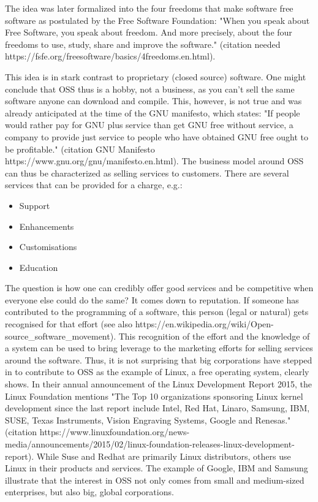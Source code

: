 \documentclass[a4paper]{report}
\begin{document}
The idea was later formalized into the four freedoms that make software free software as postulated by the Free Software Foundation: "When you speak about Free Software, you speak about freedom. And more precisely, about the four freedoms to use, study, share and improve the software." (citation needed https://fsfe.org/freesoftware/basics/4freedoms.en.html).

This idea is in stark contrast to proprietary (closed source) software. One might conclude that OSS thus is a hobby, not a business, as you can't sell the same software anyone can download and compile. This, however, is not true and was already anticipated at the time of the GNU manifesto, which states: "If people would rather pay for GNU plus service than get GNU free without service, a company to provide just service to people who have obtained GNU free ought to be profitable." (citation GNU Manifesto https://www.gnu.org/gnu/manifesto.en.html). The business model around OSS can thus be characterized as selling services to customers. There are several services that can be provided for a charge, e.g.:
\begin{itemize}
	\item Support
	\item Enhancements
	\item Customisations
	\item Education 
\end{itemize}

The question is how one can credibly offer good services and be competitive when everyone else could do the same? It comes down to reputation. If someone has contributed to the programming of a software, this person (legal or natural) gets recognised for that effort (see also https://en.wikipedia.org/wiki/Open-source\_software\_movement). This recognition of the effort and the knowledge of a system can be used to bring leverage to the marketing efforts for selling services around the software. Thus, it is not surprising that big corporations have stepped in to contribute to OSS as the example of Linux, a free operating system, clearly shows. In their annual announcement of the Linux Development Report 2015, the Linux Foundation mentions "The Top 10 organizations sponsoring Linux kernel development since the last report include Intel, Red Hat, Linaro, Samsung, IBM, SUSE, Texas Instruments, Vision Engraving Systems, Google and Renesas." (citation https://www.linuxfoundation.org/news-media/announcements/2015/02/linux-foundation-releases-linux-development-report). While Suse and Redhat are primarily Linux distributors, others use Linux in their products and services. The example of Google, IBM and Samsung illustrate that the interest in OSS not only comes from small and medium-sized enterprises, but also big, global corporations.
\end{document}

